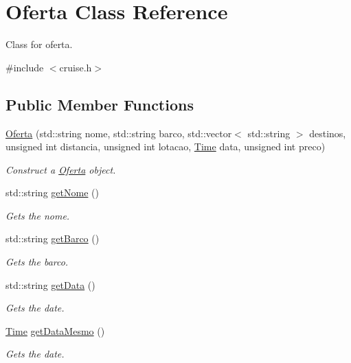 \hypertarget{classOferta}{}\section{Oferta Class Reference}
\label{classOferta}


Class for oferta.  




{\ttfamily \#include $<$cruise.\+h$>$}

\subsection*{Public Member Functions}
\begin{DoxyCompactItemize}
\item 
\hyperlink{classOferta_a49a53f9d6ba51f97a3b428c8fac98d7f}{Oferta} (std\+::string nome, std\+::string barco, std\+::vector$<$ std\+::string $>$ destinos, unsigned int distancia, unsigned int lotacao, \hyperlink{classTime}{Time} data, unsigned int preco)
\begin{DoxyCompactList}\small\item\em Construct a \hyperlink{classOferta}{Oferta} object. \end{DoxyCompactList}\item 
std\+::string \hyperlink{classOferta_a16da38d9f369b000cb544c34200707b8}{get\+Nome} ()
\begin{DoxyCompactList}\small\item\em Gets the nome. \end{DoxyCompactList}\item 
std\+::string \hyperlink{classOferta_aaed9b5937f9f33d2980fcc13ac02132c}{get\+Barco} ()
\begin{DoxyCompactList}\small\item\em Gets the barco. \end{DoxyCompactList}\item 
std\+::string \hyperlink{classOferta_a2b156b75371ad59af54ad96ad79c9d1e}{get\+Data} ()
\begin{DoxyCompactList}\small\item\em Gets the date. \end{DoxyCompactList}\item 
\hyperlink{classTime}{Time} \hyperlink{classOferta_a13ebfcae88d39a90f0c66368534ed335}{get\+Data\+Mesmo} ()
\begin{DoxyCompactList}\small\item\em Gets the date. \end{DoxyCompactList}\item 

\end{DoxyCompactItemize}
